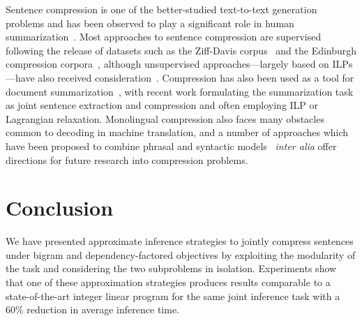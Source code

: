 \documentclass[11pt,a4paper]{article}
\begin{document}
Sentence compression is one of the better-studied text-to-text generation
problems %
and has been observed to play a significant role in
human summarization~\cite{jing00a,jing00b}.
Most approaches to sentence compression are supervised
\cite{knight02,riezler03,turner05,mcdonald06a,unno06,galley07,nomoto07,cohn09,galanis10,ganitkevitch11,napoles11b,filippova13} following the release of
datasets such as the Ziff-Davis corpus~\cite{knight00} and the
Edinburgh compression corpora~\cite{clarke06a,clarke08}, although
unsupervised approaches---largely based on ILPs---have
also received consideration~\cite{clarke07,clarke08,filippova08a}.
Compression has also been used as a tool for document
summarization~\cite{daume02,zajic07,clarke07,martins09a,bergkirkpatrick11,woodsend12,almeida13,molina13,li13,qian13}, with recent work
formulating the summarization task as joint sentence extraction and
compression and often employing %
ILP or Lagrangian relaxation.
Monolingual compression also faces many obstacles
common to decoding in machine translation, and
a number of approaches which have been proposed to combine
phrasal and syntactic models~\cite{huang07,rush11} \emph{inter alia}
offer directions for future research into
compression problems.


\section{Conclusion}
\label{conclusion}
\vspace{-2pt}
We have presented approximate inference strategies to jointly compress
    sentences under bigram and dependency-factored objectives
    by exploiting the modularity of the task and considering the
    two subproblems in isolation.
    Experiments show that one of these
    approximation strategies produces results comparable to
    a state-of-the-art integer linear program for the same
    joint inference task with a 60\% reduction
    in average inference time. %
\end{document}
